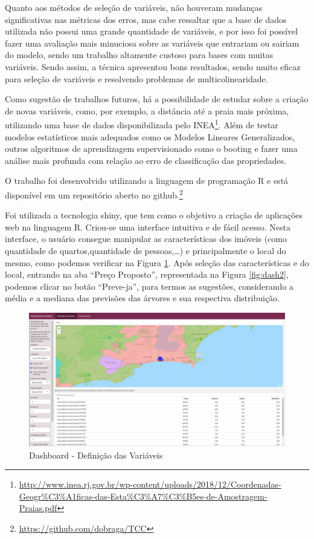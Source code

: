 \documentclass[
	12pt,				%
	a4paper,		%
	oneside,    %
	chapter=TITLE,		   %
	section=TITLE,		   %
	subsection=TITLE,	   %
	subsubsection=TITLE, %
	english,			%
	french,				%
	spanish,			%
	brazil,				%
]{abntex2}
\begin{document}
Quanto aos métodos de seleção de variáveis, não houveram mudanças
significativas nas métricas dos erros, mas cabe ressaltar que a base de
dados utilizada não possui uma grande quantidade de variáveis, e por
isso foi possível fazer uma avaliação mais minuciosa sobre as variáveis
que entrariam ou sairiam do modelo, sendo um trabalho altamente custoso
para bases com muitas variáveis. Sendo assim, a técnica apresentou bons
resultados, sendo muito eficaz para seleção de variáveis e resolvendo
problemas de multicolinearidade.

Como sugestão de trabalhos futuros, há a possibilidade de estudar sobre
a criação de novas variáveis, como, por exemplo, a distância até a praia
mais próxima, utilizando uma base de dados disponibilizada pelo
INEA\footnote{\url{http://www.inea.rj.gov.br/wp-content/uploads/2018/12/Coordenadas-Geogr\%C3\%A1ficas-das-Esta\%C3\%A7\%C3\%B5es-de-Amostragem-Praias.pdf}}.
Além de testar modelos estatísticos mais adequados como os Modelos
Lineares Generalizados, outros algoritmos de aprendizagem supervisionado
como o booting e fazer uma análise mais profunda com relação ao erro de
classificação das propriedades.

O trabalho foi desenvolvido utilizando a linguagem de programação R e
está disponível em um repositório aberto no
github.\footnote{\url{https://github.com/dobraga/TCC}}

Foi utilizada a tecnologia shiny, que tem como o objetivo a criação de
aplicações web na linguagem R. Criou-se uma interface intuitiva e de
fácil acesso. Nesta interface, o usuário consegue manipular as
características dos imóveis (como quantidade de quartos,quantidade de
pessoas,\ldots{}) e principalmente o local do mesmo, como podemos
verificar na Figura \ref{fig:dash1}. Após seleção das características e
do local, entrando na aba ``Preço Proposto'', representada na Figura
\ref{fig:dash2}, podemos clicar no botão ``Preve-ja'', para termos as
sugestões, considerando a média e a mediana das previsões das árvores e
sua respectiva distribuição.

\begin{figure}
\centering
\includegraphics[width=\textwidth,height=0.3\textheight]{../fig/dash1.png}
\caption{Dashboard - Definição das Variáveis\label{fig:dash1}}
\end{figure}
\end{document}
